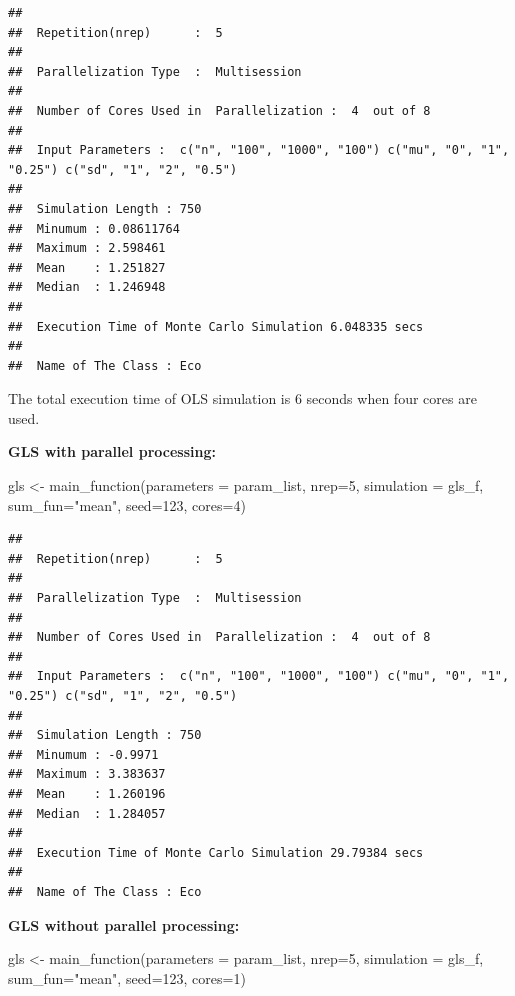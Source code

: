 \documentclass[11pt,a4paper]{article}
\newenvironment{Shaded}{\begin{snugshade}}{\end{snugshade}}
\newcommand{\AttributeTok}[1]{\textcolor[rgb]{0.77,0.63,0.00}{#1}}
\newcommand{\DecValTok}[1]{\textcolor[rgb]{0.00,0.00,0.81}{#1}}
\newcommand{\FunctionTok}[1]{\textcolor[rgb]{0.00,0.00,0.00}{#1}}
\newcommand{\NormalTok}[1]{#1}
\newcommand{\OtherTok}[1]{\textcolor[rgb]{0.56,0.35,0.01}{#1}}
\newcommand{\StringTok}[1]{\textcolor[rgb]{0.31,0.60,0.02}{#1}}
\begin{document}
\begin{verbatim}
## 
##  Repetition(nrep)      :  5 
## 
##  Parallelization Type  :  Multisession 
## 
##  Number of Cores Used in  Parallelization :  4  out of 8 
## 
##  Input Parameters :  c("n", "100", "1000", "100") c("mu", "0", "1", "0.25") c("sd", "1", "2", "0.5") 
## 
##  Simulation Length : 750 
##  Minumum : 0.08611764 
##  Maximum : 2.598461 
##  Mean    : 1.251827 
##  Median  : 1.246948 
## 
##  Execution Time of Monte Carlo Simulation 6.048335 secs 
## 
##  Name of The Class : Eco
\end{verbatim}

The total execution time of OLS simulation is 6 seconds when four cores
are used.

\textbf{GLS with parallel processing:}

\begin{Shaded}
\begin{Highlighting}[]
\NormalTok{gls }\OtherTok{\textless{}{-}} \FunctionTok{main\_function}\NormalTok{(}\AttributeTok{parameters =}\NormalTok{ param\_list,}
                     \AttributeTok{nrep=}\DecValTok{5}\NormalTok{,}
                     \AttributeTok{simulation =}\NormalTok{ gls\_f,}
                     \AttributeTok{sum\_fun=}\StringTok{"mean"}\NormalTok{,}
                     \AttributeTok{seed=}\DecValTok{123}\NormalTok{,}
                     \AttributeTok{cores=}\DecValTok{4}\NormalTok{)}
\end{Highlighting}
\end{Shaded}

\begin{verbatim}
## 
##  Repetition(nrep)      :  5 
## 
##  Parallelization Type  :  Multisession 
## 
##  Number of Cores Used in  Parallelization :  4  out of 8 
## 
##  Input Parameters :  c("n", "100", "1000", "100") c("mu", "0", "1", "0.25") c("sd", "1", "2", "0.5") 
## 
##  Simulation Length : 750 
##  Minumum : -0.9971 
##  Maximum : 3.383637 
##  Mean    : 1.260196 
##  Median  : 1.284057 
## 
##  Execution Time of Monte Carlo Simulation 29.79384 secs 
## 
##  Name of The Class : Eco
\end{verbatim}

\textbf{GLS without parallel processing:}

\begin{Shaded}
\begin{Highlighting}[]
\NormalTok{gls }\OtherTok{\textless{}{-}} \FunctionTok{main\_function}\NormalTok{(}\AttributeTok{parameters =}\NormalTok{ param\_list,}
                     \AttributeTok{nrep=}\DecValTok{5}\NormalTok{,}
                     \AttributeTok{simulation =}\NormalTok{ gls\_f,}
                     \AttributeTok{sum\_fun=}\StringTok{"mean"}\NormalTok{,}
                     \AttributeTok{seed=}\DecValTok{123}\NormalTok{,}
                     \AttributeTok{cores=}\DecValTok{1}\NormalTok{)}
\end{Highlighting}
\end{Shaded}
\end{document}
